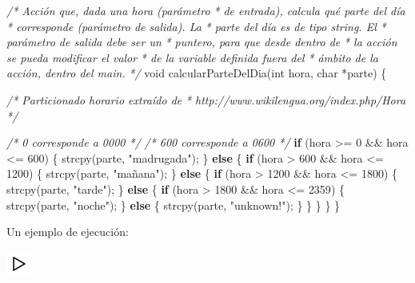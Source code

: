\documentclass[
]{book}
\newenvironment{Shaded}{\begin{snugshade}}{\end{snugshade}}
\newcommand{\CommentTok}[1]{\textcolor[rgb]{0.56,0.35,0.01}{\textit{#1}}}
\newcommand{\ControlFlowTok}[1]{\textcolor[rgb]{0.13,0.29,0.53}{\textbf{#1}}}
\newcommand{\DataTypeTok}[1]{\textcolor[rgb]{0.13,0.29,0.53}{#1}}
\newcommand{\DecValTok}[1]{\textcolor[rgb]{0.00,0.00,0.81}{#1}}
\newcommand{\NormalTok}[1]{#1}
\newcommand{\StringTok}[1]{\textcolor[rgb]{0.31,0.60,0.02}{#1}}
\begin{document}
\begin{Shaded}
\begin{Highlighting}[]
\CommentTok{/* Acción que, dada una hora (parámetro}
\CommentTok{ * de entrada), calcula qué parte del día}
\CommentTok{ * corresponde (parámetro de salida). La}
\CommentTok{ * parte del día es de tipo string. El}
\CommentTok{ * parámetro de salida debe ser un}
\CommentTok{ * puntero, para que desde dentro de}
\CommentTok{ * la acción se pueda modificar el valor}
\CommentTok{ * de la variable definida fuera del}
\CommentTok{ * ámbito de la acción, dentro del main.}
\CommentTok{ */}
\DataTypeTok{void}\NormalTok{ calcularParteDelDia(}\DataTypeTok{int}\NormalTok{ hora, }\DataTypeTok{char}\NormalTok{ *parte) \{}

    \CommentTok{/* Particionado horario extraído de}
\CommentTok{     * http://www.wikilengua.org/index.php/Hora}
\CommentTok{     */}

    \CommentTok{/* 0 corresponde a 0000 */}
    \CommentTok{/* 600 corresponde a 0600 */}
    \ControlFlowTok{if}\NormalTok{ (hora \textgreater{}= }\DecValTok{0}\NormalTok{ \&\& hora \textless{}= }\DecValTok{600}\NormalTok{) \{}
\NormalTok{        strcpy(parte, }\StringTok{"madrugada"}\NormalTok{);}
\NormalTok{    \} }\ControlFlowTok{else}\NormalTok{ \{}
        \ControlFlowTok{if}\NormalTok{ (hora \textgreater{} }\DecValTok{600}\NormalTok{ \&\& hora \textless{}= }\DecValTok{1200}\NormalTok{) \{}
\NormalTok{            strcpy(parte, }\StringTok{"mañana"}\NormalTok{);}
\NormalTok{        \} }\ControlFlowTok{else}\NormalTok{ \{}
            \ControlFlowTok{if}\NormalTok{ (hora \textgreater{} }\DecValTok{1200}\NormalTok{ \&\& hora \textless{}= }\DecValTok{1800}\NormalTok{) \{}
\NormalTok{                strcpy(parte, }\StringTok{"tarde"}\NormalTok{);}
\NormalTok{            \} }\ControlFlowTok{else}\NormalTok{ \{}
                \ControlFlowTok{if}\NormalTok{ (hora \textgreater{} }\DecValTok{1800}\NormalTok{ \&\& hora \textless{}= }\DecValTok{2359}\NormalTok{) \{}
\NormalTok{                    strcpy(parte, }\StringTok{"noche"}\NormalTok{);}
\NormalTok{                \} }\ControlFlowTok{else}\NormalTok{ \{}
\NormalTok{                    strcpy(parte, }\StringTok{"unknown!"}\NormalTok{);}
\NormalTok{                \}}
\NormalTok{            \}}
\NormalTok{        \}}
\NormalTok{    \}}
\NormalTok{\}}
\end{Highlighting}
\end{Shaded}

Un ejemplo de ejecución:

\includegraphics{./img/play.png}
\end{document}
